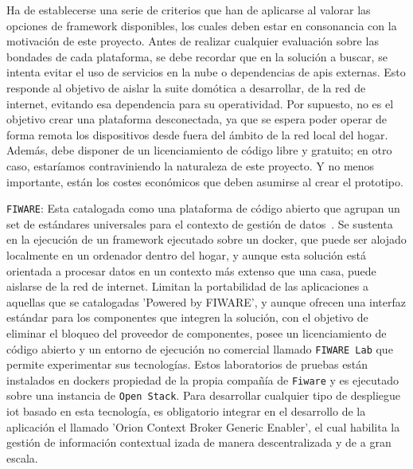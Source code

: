 Ha de establecerse una serie de criterios que han de aplicarse al valorar las opciones de \gls{framework} disponibles, los cuales deben estar en consonancia con la motivación de este proyecto. Antes de realizar cualquier evaluación sobre las bondades de cada plataforma, se debe recordar que en la solución a buscar, se intenta evitar el uso de servicios en la nube o dependencias de \gls{api}s externas. Esto responde al objetivo de aislar la suite domótica a desarrollar, de la red de internet, evitando esa dependencia para su operatividad. Por supuesto, no es el objetivo crear una plataforma desconectada, ya que se espera poder operar de forma remota los dispositivos desde fuera del ámbito de la red local del hogar. Además, debe disponer de un licenciamiento de código libre y gratuito; en otro caso, estaríamos contraviniendo la naturaleza de este proyecto. Y no menos importante, están los costes económicos que deben asumirse al crear el prototipo.

\vspace{1cm}

\verb|FIWARE|: Esta catalogada como una plataforma de código abierto que agrupan un set de estándares universales para el contexto de gestión de datos~\cite{whatisfiware}. Se sustenta en la ejecución de un \gls{framework} ejecutado sobre un \gls{docker}, que puede ser alojado localmente en un ordenador dentro del hogar, y aunque esta solución está orientada a procesar datos en un contexto más extenso que una casa, puede aislarse de la red de internet. Limitan la portabilidad de las aplicaciones a aquellas que se catalogadas 'Powered by FIWARE', y aunque ofrecen una interfaz estándar para los componentes que integren la solución, con el objetivo de eliminar el bloqueo del proveedor de componentes, posee un licenciamiento de código abierto y un entorno  de ejecución no comercial llamado \verb|FIWARE Lab| que permite experimentar sus tecnologías. Estos laboratorios de pruebas están instalados en \gls{docker}s propiedad de la propia compañía de \verb|Fiware| y es ejecutado sobre una instancia de \verb|Open Stack|. Para desarrollar cualquier tipo de despliegue \gls{iot} basado en esta tecnología, es obligatorio integrar en el desarrollo de la aplicación el llamado 'Orion Context Broker Generic Enabler', el cual habilita la gestión de información contextual izada de manera descentralizada y de a gran escala.

